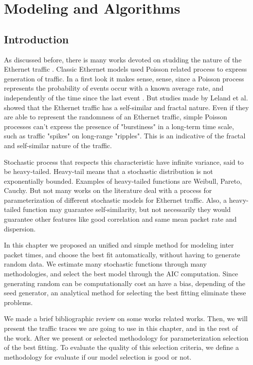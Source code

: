 \chapter{Modeling and Algorithms}\label{ch:modeling-evaluation}

\section{Introduction}

As discussed before, there is many works devoted on studding the nature of the Ethernet traffic \cite{selfsimilar-ethernet}. Classic Ethernet models used Poisson related process to express generation of traffic. In a first look it makes sense,  sense, since a Poisson process represents the probability of events occur with a known average rate, and independently of the time since the last event\cite{selfsimilar-ethernet} \cite{book-poisson}. But studies made by Leland et al.\cite{selfsimilar-ethernet} showed that the Ethernet traffic has a self-similar and fractal nature. Even if they are able to represent the randomness of an Ethernet traffic, simple Poisson processes can't express the presence of "burstiness" in a long-term time scale, such as traffic "spikes" on long-range "ripples".  This is an indicative of the fractal and self-similar nature of the traffic.

Stochastic process that respects this characteristic have infinite variance, said to be heavy-tailed. Heavy-tail means that a stochastic distribution is not exponentially bounded\cite{sourcesonoff-paper}. Examples of heavy-tailed functions are Weibull, Pareto, Cauchy. But not many works on the literature deal with a process for parameterization of different stochastic models for Ethernet traffic. Also, a heavy-tailed function may guarantee self-similarity, but not necessarily they would guarantee other features like good correlation and same mean packet rate and dispersion.

In this chapter we proposed an unified and simple method for modeling inter packet times, and choose the best fit automatically, without having to generate random data. We estimate many stochastic functions through many methodologies, and select the best model through the AIC computation. Since generating random can be computationally cost an have a bias, depending of the seed generator, an analytical method for selecting the best fitting eliminate these problems.

We made a brief bibliographic review on some works related works. Then, we will present the traffic traces we are going to use in this chapter, and in the rest of the work. After we present or selected methodology for parameterization selection of the best fitting. To evaluate the quality of this selection criteria, we define a methodology for evaluate if our model selection is good or not. 

